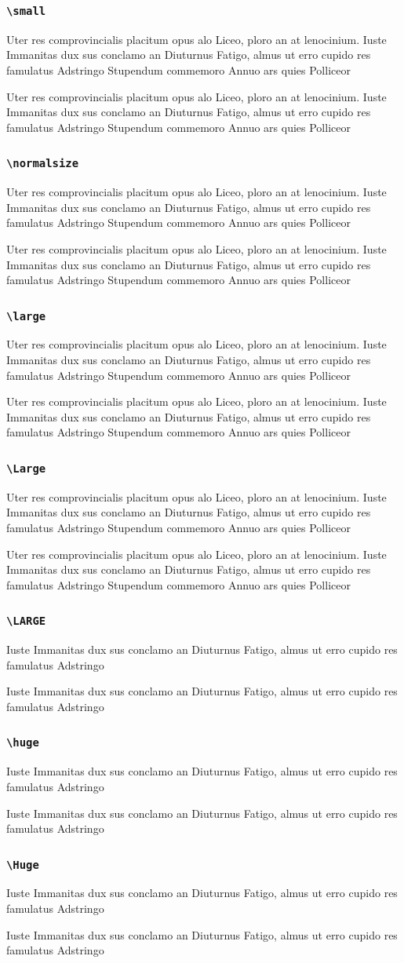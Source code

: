 \documentclass[t]{beamer}
\newcommand{\parxmpl}{
  Uter res comprovincialis placitum opus alo Liceo, ploro an at lenocinium.
  Iuste Immanitas dux sus conclamo an Diuturnus
  Fatigo, almus ut erro cupido res famulatus Adstringo
  Stupendum commemoro Annuo ars quies Polliceor
}
\newcommand{\Parxmpl}{
  Iuste Immanitas dux sus conclamo an Diuturnus
  Fatigo, almus ut erro cupido res famulatus Adstringo
}
\begin{document}
\begin{frame}
  \frametitle{\texttt{\textbackslash small}}
  \small

  \parxmpl

  \parxmpl

\end{frame}

\begin{frame}
  \frametitle{\texttt{\textbackslash normalsize}}

  \parxmpl

  \normalsize\parxmpl

\end{frame}

\begin{frame}
  \frametitle{\texttt{\textbackslash large}}
  \large

  \parxmpl

  \parxmpl

\end{frame}

\begin{frame}
  \frametitle{\texttt{\textbackslash Large}}
  \Large

  \parxmpl

  \parxmpl

\end{frame}

\begin{frame}
  \frametitle{\texttt{\textbackslash LARGE}}
  \LARGE

  \Parxmpl

  \Parxmpl

\end{frame}

\begin{frame}
  \frametitle{\texttt{\textbackslash huge}}
  \huge

  \Parxmpl

  \Parxmpl

\end{frame}

\begin{frame}
  \frametitle{\texttt{\textbackslash Huge}}
  \Huge

  \Parxmpl

  \Parxmpl

\end{frame}
\end{document}
